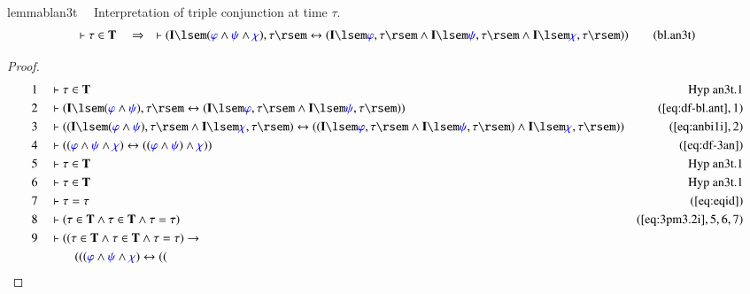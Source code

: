 \begin{restatable}{lemma}{blan3t}~~ Interpretation of triple conjunction at
time $\tau$.
\begin{align}
\vdash \tau \in \mathbf{T}\quad\Rightarrow\quad \vdash ( \mathbf{I} \lsem (
    \mw{\varphi} \wedge \mw{\psi} \wedge \mw{\chi} ) , \tau \rsem
    \leftrightarrow ( \mathbf{I} \lsem \mw{\varphi} , \tau \rsem \wedge
    \mathbf{I} \lsem \mw{\psi} , \tau \rsem \wedge \mathbf{I} \lsem \mw{\chi} ,
    \tau \rsem ) )\label{eq:bl.an3t}\tag{bl.an3t}
\end{align}
\end{restatable}

\begin{proof}
\begin{align}
  1 &&  & \vdash \tau \in \mathbf{T}&\text{Hyp~an3t.1}\notag%
  \\ 2 &&  & \vdash ( \mathbf{I} \lsem ( \mw{\varphi} \wedge \mw{\psi} ) , \tau
      \rsem \leftrightarrow ( \mathbf{I} \lsem \mw{\varphi}
      , \tau \rsem \wedge \mathbf{I} \lsem \mw{\psi} , \tau
      \rsem ) )&(\mbox{\ref{eq:df-bl.ant}},1)\notag
  \\ 3 &&  & \vdash ( ( \mathbf{I} \lsem ( \mw{\varphi} \wedge \mw{\psi} ) ,
      \tau \rsem \wedge \mathbf{I} \lsem \mw{\chi} , \tau
      \rsem ) \leftrightarrow ( ( \mathbf{I} \lsem
      \mw{\varphi} , \tau \rsem \wedge \mathbf{I} \lsem
      \mw{\psi} , \tau \rsem ) \wedge \mathbf{I} \lsem
      \mw{\chi} , \tau \rsem )
      )&(\mbox{\ref{eq:anbi1i}},2)\notag
  \\ 4 &&  & \vdash ( ( \mw{\varphi} \wedge \mw{\psi} \wedge \mw{\chi} )
      \leftrightarrow ( ( \mw{\varphi} \wedge \mw{\psi} )
      \wedge \mw{\chi} ) )&(\mbox{\ref{eq:df-3an}})\notag
  \\ 5 &&  & \vdash \tau \in \mathbf{T}&\text{Hyp~an3t.1}\notag%
  \\ 6 &&  & \vdash \tau \in \mathbf{T}&\text{Hyp~an3t.1}\notag%
  \\ 7 &&  & \vdash \tau = \tau&(\mbox{\ref{eq:eqid}})\notag
  \\ 8 &&  & \vdash ( \tau \in \mathbf{T} \wedge \tau \in \mathbf{T} \wedge
      \tau = \tau )&(\mbox{\ref{eq:3pm3.2i}},5,6,7)\notag
  \\ 9 &&  & \vdash ( ( \tau \in \mathbf{T} \wedge \tau \in \mathbf{T} \wedge
      \tau = \tau ) \rightarrow  \notag \\ & & & \qquad
      ( ( ( \mw{\varphi} \wedge
      \mw{\psi} \wedge \mw{\chi} ) \leftrightarrow ( (

\end{align}
\end{proof}
